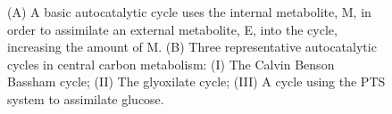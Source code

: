 \documentclass[a4page,notitlepage]{article}
\begin{document}
\begin{figure}[h!]
{\begin{tikzpicture}
\end{tikzpicture}
}
\caption{
    \label{fig:realautocatal}
(A) A basic autocatalytic cycle uses the internal metabolite, M, in order to assimilate an external metabolite, E, into the cycle, increasing the amount of M.
(B) Three representative autocatalytic cycles in central carbon metabolism: (I) The Calvin Benson Bassham cycle; (II) The glyoxilate cycle; (III) A cycle using the PTS system to assimilate glucose.
}
\end{figure}
\end{document}
